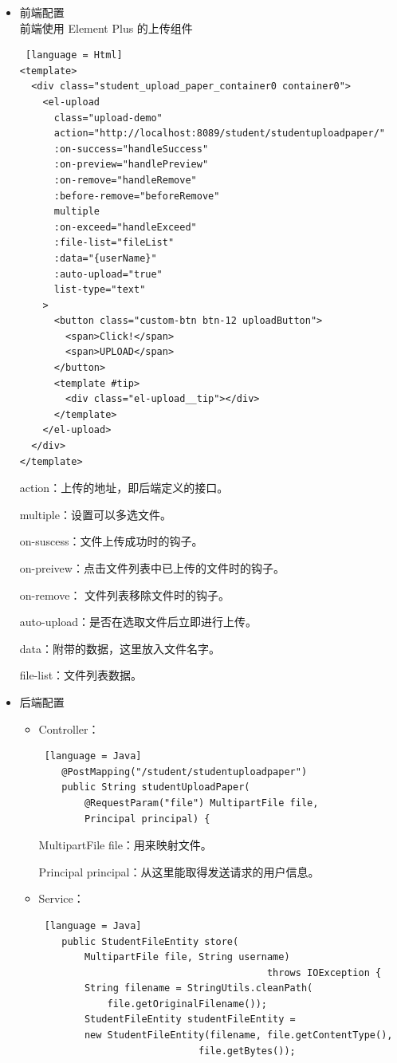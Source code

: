 \begin{itemize}
  \item 前端配置\\
        前端使用 Element Plus 的上传组件
        \begin{lstlisting} [language = Html]
<template>
  <div class="student_upload_paper_container0 container0">
    <el-upload
      class="upload-demo"
      action="http://localhost:8089/student/studentuploadpaper/"
      :on-success="handleSuccess"
      :on-preview="handlePreview"
      :on-remove="handleRemove"
      :before-remove="beforeRemove"
      multiple
      :on-exceed="handleExceed"
      :file-list="fileList"
      :data="{userName}"
      :auto-upload="true"
      list-type="text"
    >
      <button class="custom-btn btn-12 uploadButton">
        <span>Click!</span>
        <span>UPLOAD</span>
      </button>
      <template #tip>
        <div class="el-upload__tip"></div>
      </template>
    </el-upload>
  </div>
</template>
    \end{lstlisting}
        action：上传的地址，即后端定义的接口。

        multiple：设置可以多选文件。

        on-suscess：文件上传成功时的钩子。

        on-preivew：点击文件列表中已上传的文件时的钩子。

        on-remove：	文件列表移除文件时的钩子。

        auto-upload：是否在选取文件后立即进行上传。

        data：附带的数据，这里放入文件名字。

        file-list：文件列表数据。

  \item 后端配置
        \begin{itemize}
          \item Controller：
                \begin{lstlisting} [language = Java]
    @PostMapping("/student/studentuploadpaper")
    public String studentUploadPaper(
        @RequestParam("file") MultipartFile file, 
        Principal principal) {
        \end{lstlisting}
                MultipartFile file：用来映射文件。

                Principal principal：从这里能取得发送请求的用户信息。
          \item Service：
                \begin{lstlisting} [language = Java]
    public StudentFileEntity store(
        MultipartFile file, String username) 
                                        throws IOException {
        String filename = StringUtils.cleanPath(
            file.getOriginalFilename());
        StudentFileEntity studentFileEntity = 
        new StudentFileEntity(filename, file.getContentType(), 
                            file.getBytes());


\end{lstlisting}
\end{itemize}
\end{itemize}
